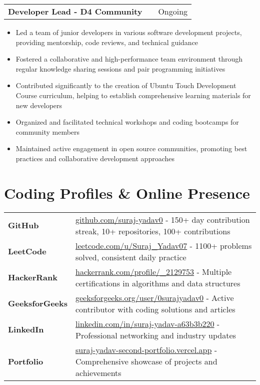 \documentclass[a4paper,12pt]{article}
\makeatletter
\newenvironment{joblong}[2]
    {
    \begin{tabularx}{\linewidth}{@{}l X r@{}}
    \textbf{#1} & \hfill &  #2 \\[3.75pt]
    \end{tabularx}
    \begin{minipage}[t]{\linewidth}
    \begin{itemize}[nosep,after=\strut, leftmargin=1em, itemsep=3pt,label=--]
    }
    {
    \end{itemize}
    \end{minipage}    
    }
\makeatother
\begin{document}
\begin{joblong}{Developer Lead - D4 Community}{Ongoing}
\item Led a team of junior developers in various software development projects, providing mentorship, code reviews, and technical guidance
\item Fostered a collaborative and high-performance team environment through regular knowledge sharing sessions and pair programming initiatives
\item Contributed significantly to the creation of Ubuntu Touch Development Course curriculum, helping to establish comprehensive learning materials for new developers
\item Organized and facilitated technical workshops and coding bootcamps for community members
\item Maintained active engagement in open source communities, promoting best practices and collaborative development approaches
\end{joblong}

\section{Coding Profiles \& Online Presence}
\begin{tabularx}{\linewidth}{@{}l X@{}}
\textbf{GitHub} & \href{https://github.com/suraj-yadav0}{github.com/suraj-yadav0} - 150+ day contribution streak, 10+ repositories, 100+ contributions \\
\textbf{LeetCode} & \href{https://leetcode.com/u/Suraj_Yadav07/}{leetcode.com/u/Suraj\_Yadav07} - 1100+ problems solved, consistent daily practice \\
\textbf{HackerRank} & \href{https://www.hackerrank.com/profile/_2129753}{hackerrank.com/profile/\_2129753} - Multiple certifications in algorithms and data structures \\
\textbf{GeeksforGeeks} & \href{https://www.geeksforgeeks.org/user/0surajyadav0/}{geeksforgeeks.org/user/0surajyadav0} - Active contributor with coding solutions and articles \\
\textbf{LinkedIn} & \href{https://www.linkedin.com/in/suraj-yadav-a63b3b220/}{linkedin.com/in/suraj-yadav-a63b3b220} - Professional networking and industry updates \\
\textbf{Portfolio} & \href{https://suraj-yadav-second-portfolio.vercel.app/}{suraj-yadav-second-portfolio.vercel.app} - Comprehensive showcase of projects and achievements \\
\end{tabularx}

\vfill
{}
\end{document}

